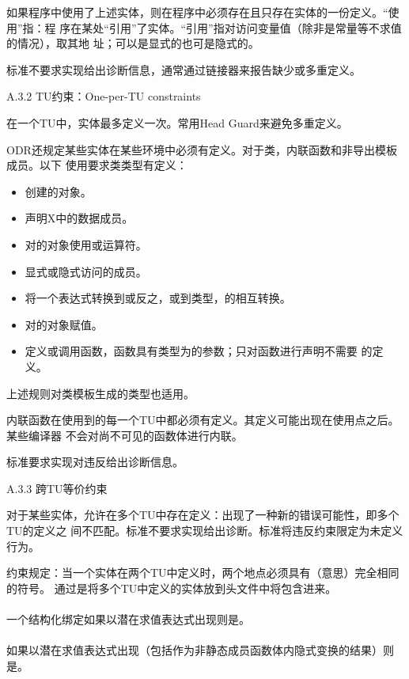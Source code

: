 \begin{transnote}
如果程序中使用了上述实体，则在程序中必须存在且只存在实体的一份定义。“使用”指：程
序在某处“引用”了实体。“引用”指对访问变量值（除非是常量等不求值的情况），取其地
址；可以是显式的也可是隐式的。

标准不要求实现给出诊断信息，通常通过链接器来报告缺少或多重定义。

A.3.2 TU约束：One-per-TU constraints

在一个TU中，实体最多定义一次。常用Head Guard来避免多重定义。

ODR还规定某些实体在某些环境中必须有定义。对于类，内联函数和非导出模板成员。以下
使用要求类类型有定义：
\begin{itemize}
  \item 创建的对象。
  \item 声明X中的数据成员。
  \item 对的对象使用或运算符。
  \item 显式或隐式访问的成员。
  \item 将一个表达式转换到或反之，或到类型，的相互转换。
  \item 对的对象赋值。
  \item 定义或调用函数，函数具有类型为的参数；只对函数进行声明不需要
        的定义。
\end{itemize}
上述规则对类模板生成的类型也适用。

内联函数在使用到的每一个TU中都必须有定义。其定义可能出现在使用点之后。某些编译器
不会对尚不可见的函数体进行内联。

标准要求实现对违反给出诊断信息。

A.3.3 跨TU等价约束

对于某些实体，允许在多个TU中存在定义：出现了一种新的错误可能性，即多个TU的定义之
间不匹配。标准不要求实现给出诊断。标准将违反约束限定为未定义行为。

约束规定：当一个实体在两个TU中定义时，两个地点必须具有（意思）完全相同的符号。
通过是将多个TU中定义的实体放到头文件中将包含进来。

\end{transnote}

\paragraph{} %
一个结构化绑定如果以潜在求值表达式出现则是\odrused{}。

\paragraph{} %
如果以潜在求值表达式出现（包括作为非静态成员函数体内隐式变换的结果）则
是\odrused{}。

